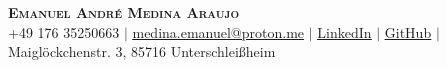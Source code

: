 \begin{center}
    \textbf{\Huge \scshape Emanuel André Medina Araujo} \\ \vspace{1pt}
    \small 
    +49 176 35250663 $|$
    \href{mailto:medina.emanuel@proton.me}{\underline{medina.emanuel@proton.me}} $|$ 
    \href{https://linkedin.com/in/Emanuel-Medina-Araujo}{\underline{LinkedIn}} $|$ 
    \href{https://github.com/EmanuelMedinaAraujo}{\underline{GitHub}} $|$
    Maiglöckchenstr. 3, 85716 Unterschleißheim

\end{center}
